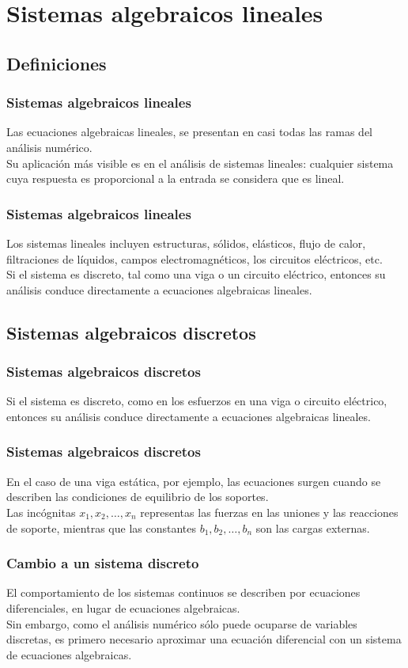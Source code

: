 \section{Sistemas algebraicos lineales}
\subsection{Definiciones}
\begin{frame}
\frametitle{Sistemas algebraicos lineales}
Las ecuaciones algebraicas lineales, se presentan en casi todas las ramas del análisis numérico. 
\\
\bigskip
Su aplicación más visible es en el análisis de sistemas lineales: cualquier sistema cuya respuesta es proporcional a la entrada se considera que es lineal.
\end{frame}
\begin{frame}
\frametitle{Sistemas algebraicos lineales}
Los sistemas lineales incluyen estructuras, sólidos, elásticos, flujo de calor, filtraciones de líquidos, campos electromagnéticos, los circuitos eléctricos, etc. 
\\
\bigskip
Si el sistema es discreto, tal como una viga o un circuito eléctrico, entonces su análisis conduce directamente a ecuaciones algebraicas lineales.
\end{frame}
\subsection*{Sistemas algebraicos discretos}
\begin{frame}
\frametitle{Sistemas algebraicos discretos}
Si el sistema es discreto, como en los esfuerzos en una viga o circuito eléctrico, entonces su análisis conduce directamente a ecuaciones algebraicas lineales.
\end{frame}
\begin{frame}
\frametitle{Sistemas algebraicos discretos}
En el caso de una viga estática, por ejemplo, las ecuaciones surgen cuando se describen las condiciones de equilibrio de los soportes.
\\
\bigskip
Las incógnitas $x_{1}, x_{2}, \ldots, x_{n}$ representas las fuerzas en las uniones y las reacciones de soporte, mientras que las constantes $b_{1}, b_{2}, \ldots, b_{n}$ son las cargas externas.    
\end{frame}
\begin{frame}
\frametitle{Cambio a un sistema discreto}
El comportamiento de los sistemas continuos se describen por ecuaciones diferenciales, en lugar de ecuaciones algebraicas.
\\
\bigskip
Sin embargo, como el análisis numérico sólo puede ocuparse de variables discretas, es primero necesario aproximar una ecuación diferencial con un sistema de ecuaciones algebraicas.
\end{frame}
